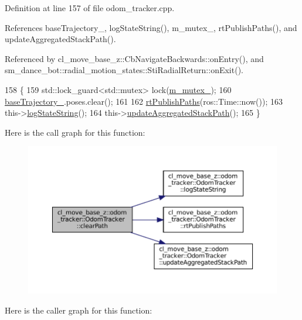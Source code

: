Definition at line 157 of file odom\+\_\+tracker.\+cpp.



References base\+Trajectory\+\_\+, log\+State\+String(), m\+\_\+mutex\+\_\+, rt\+Publish\+Paths(), and update\+Aggregated\+Stack\+Path().



Referenced by cl\+\_\+move\+\_\+base\+\_\+z\+::\+Cb\+Navigate\+Backwards\+::on\+Entry(), and sm\+\_\+dance\+\_\+bot\+::radial\+\_\+motion\+\_\+states\+::\+Sti\+Radial\+Return\+::on\+Exit().


\begin{DoxyCode}
158 \{
159   std::lock\_guard<std::mutex> lock(\hyperlink{classcl__move__base__z_1_1odom__tracker_1_1OdomTracker_aa371639e1eee269273dec8d3ab9dba0f}{m\_mutex\_});
160   \hyperlink{classcl__move__base__z_1_1odom__tracker_1_1OdomTracker_a466d18a86df049f0f680e043bb5ea91f}{baseTrajectory\_}.poses.clear();
161 
162   \hyperlink{classcl__move__base__z_1_1odom__tracker_1_1OdomTracker_a8f728f85d1f3f49f4b94e37052a59d6d}{rtPublishPaths}(ros::Time::now());
163   this->\hyperlink{classcl__move__base__z_1_1odom__tracker_1_1OdomTracker_a6d0b450474d9d555205ff4281965164e}{logStateString}();
164   this->\hyperlink{classcl__move__base__z_1_1odom__tracker_1_1OdomTracker_a7922f1e1e688a2ed62d32d9914985a9f}{updateAggregatedStackPath}();
165 \}
\end{DoxyCode}
Here is the call graph for this function\+:
\nopagebreak
\begin{figure}[H]
\begin{center}
\leavevmode
\includegraphics[width=350pt]{classcl__move__base__z_1_1odom__tracker_1_1OdomTracker_a93a14e15e3e623f530e056f403bf7644_cgraph}
\end{center}
\end{figure}
Here is the caller graph for this function\+:
\nopagebreak
